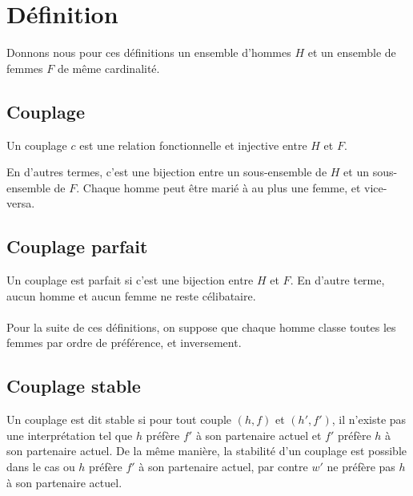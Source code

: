 \documentclass[11pt]{article}
\begin{document}
\section{Définition}

Donnons nous pour ces définitions un ensemble d'hommes $H$ et un ensemble
de femmes $F$ de même cardinalité.

\subsection{Couplage}

Un couplage $c$ est une relation fonctionnelle et injective entre $H$ et $F$.

En d’autres termes, c'est une bijection entre un sous-ensemble de $H$ et un
sous-ensemble de $F$.
Chaque homme peut être marié à au plus une femme, et vice-versa.

\subsection{Couplage parfait}
Un couplage est parfait si c’est une bijection entre $H$ et $F$.
En d'autre terme, aucun homme et aucun femme ne reste célibataire.\\\\

Pour la suite de ces définitions, on suppose que chaque homme classe toutes les femmes par ordre de
préférence, et inversement.

\subsection{Couplage stable}
Un couplage est dit stable si pour tout couple $(h, f)$ et $(h', f')$, il n'existe pas une interprétation tel que  $h$ préfère $f'$ à son partenaire actuel et $f'$ préfère $h$ à son partenaire actuel. De la même manière, la stabilité d'un couplage est possible dans le cas ou $h$ préfère $f'$ à son partenaire actuel, par contre $w'$ ne préfère pas $h$ à son partenaire actuel. 
\end{document}
